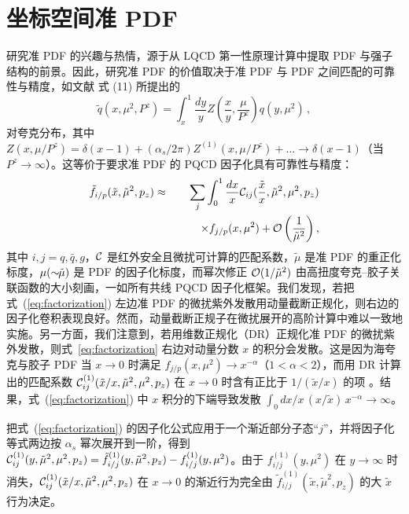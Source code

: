 \section{坐标空间准 PDF}
\label{sec:def}

研究准 PDF 的兴趣与热情，源于从 LQCD 第一性原理计算中提取 PDF 与强子结构的前景。因此，研究准 PDF 的价值取决于准 PDF 与 PDF 之间匹配的可靠性与精度，如文献 \cite{Ji:2013dva} 式 (11) 所提出的
\begin{equation}
\label{eq:matching_ji}
\tilde{q}(x,\mu^2,P^z) = \int_x^1 \frac{dy}{y} Z\left(\frac{x}{y},\frac{\mu}{P^z}\right) q(y,\mu^2) \, ,
\end{equation}
对夸克分布，其中 $Z(x,\mu/P^z)=\delta(x-1)+(\alpha_s/2\pi)Z^{(1)}(x,\mu/P^z) +\dots \to \delta(x-1)$（当 $P^z\to \infty$）。这等价于要求准 PDF 的 PQCD 因子化具有可靠性与精度：
\begin{eqnarray}
\label{eq:factorization}
\tilde{f}_{i/p}(\tilde{x},\tilde{\mu}^2,p_z) & \approx &
\sum_{j} \int_0^1 \frac{dx}{x} {\cal C}_{ij}(\frac{\tilde{x}}{x},\tilde{\mu}^2,\mu^2,p_z)
\nonumber \\
&& \hskip 0.3in
\times f_{j/p}(x,\mu^2) + {\cal O}\left(\frac{1}{\tilde{\mu}^2}\right),
\end{eqnarray}
其中 $i, j =q, \bar{q}, g$，${\cal C}$ 是红外安全且微扰可计算的匹配系数，$\tilde{\mu}$ 是准 PDF 的重正化标度，$\mu (\sim{\hskip -0.05in}\tilde{\mu})$ 是 PDF 的因子化标度，而幂次修正 ${\cal O}(1/\tilde{\mu}^2)$ 由高扭度夸克--胶子关联函数的大小刻画，一如所有共线 PQCD 因子化框架。我们发现，若把式~(\ref{eq:factorization}) 左边准 PDF 的微扰紫外发散用动量截断正规化，则右边的因子化卷积表现良好。然而，动量截断正规子在微扰展开的高阶计算中难以一致地实施。另一方面，我们注意到，若用维数正规化（DR）正规化准 PDF 的微扰紫外发散，则式~\eqref{eq:factorization} 右边对动量分数 $x$ 的积分会发散。这是因为海夸克与胶子 PDF 当 $x\to0$ 时满足 $f_{j/p}(x,\mu^2) \to x^{-\alpha}$（$1<\alpha<2$），而用 DR 计算出的匹配系数 ${\cal C}^{(1)}_{ij}(\tilde{x}/x,\tilde{\mu}^2,\mu^2,p_z)$ 在 $x\to 0$ 时含有正比于 $1/(\tilde{x}/x)$ 的项 \cite{Ma:2014jla,Xiong:2013bka}。结果，式~(\ref{eq:factorization}) 中 $x$ 积分的下端导致发散 $\int_0 dx/x\, (x/\tilde{x})\, x^{-\alpha} \to \infty$。

把式~(\ref{eq:factorization}) 的因子化公式应用于一个渐近部分子态``$j$''，并将因子化等式两边按 $\alpha_s$ 幂次展开到一阶，得到 ${\cal C}^{(1)}_{ij}(y,\tilde{\mu}^2,\mu^2,p_z)=\tilde{f}^{(1)}_{i/j}(y,\tilde{\mu}^2,p_z) - f^{(1)}_{i/j}(y,\mu^2)$。由于 $f^{(1)}_{i/j}(y,\mu^2)$ 在 $y\to\infty$ 时消失，${\cal C}^{(1)}_{ij}(\tilde{x}/x,\tilde{\mu}^2,\mu^2,p_z)$ 在 $x\to 0$ 的渐近行为完全由 $\tilde{f}^{(1)}_{i/j}(\tilde{x},\tilde{\mu}^2,p_z)$ 的大 $\tilde{x}$ 行为决定。

